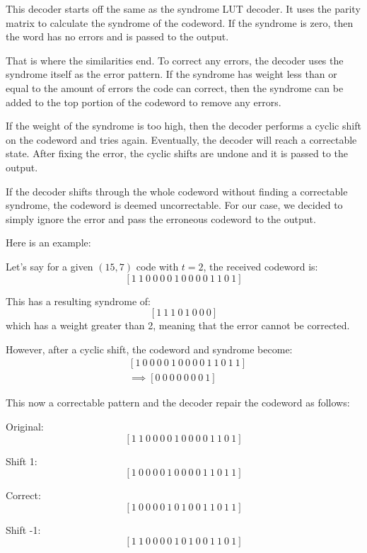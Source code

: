 \documentclass{article}
\begin{document}
This decoder starts off the same as the syndrome LUT decoder. It uses the parity matrix to calculate the syndrome of the codeword. If the syndrome is zero, then the word has no errors and is passed to the output.

That is where the similarities end. To correct any errors, the decoder uses the syndrome itself as the error pattern. If the syndrome has weight less than or equal to the amount of errors the code can correct, then the syndrome can be added to the top portion of the codeword to remove any errors.

If the weight of the syndrome is too high, then the decoder performs a cyclic shift on the codeword and tries again. Eventually, the decoder will reach a correctable state. After fixing the error, the cyclic shifts are undone and it is passed to the output.

If the decoder shifts through the whole codeword without finding a correctable syndrome, the codeword is deemed uncorrectable. For our case, we decided to simply ignore the error and pass the erroneous codeword to the output.


Here is an example:

Let's say for a given $(15,7)$ code with $t=2$, the received codeword is:
\[
    [1\ 1\ 0\ 0\ 0\ 0\ 1\ 0\ 0\ 0\ 0\ 1\ 1\ 0\ 1]
\]

This has a resulting syndrome of:
\[
    [1\ 1\ 1\ 0\ 1\ 0\ 0\ 0]
\]
which has a weight greater than 2, meaning that the error cannot be corrected. 

However, after a cyclic shift, the codeword and syndrome become:
\begin{equation*}
    \begin{split}
        &[1\ 0\ 0\ 0\ 0\ 1\ 0\ 0\ 0\ 0\ 1\ 1\ 0\ 1\ 1] \\
        &\implies [0\ 0\ 0\ 0\ 0\ 0\ 0\ 1]
    \end{split}
\end{equation*}

This now a correctable pattern and the decoder repair the codeword as follows:

Original: 
\[
    [1\ 1\ 0\ 0\ 0\ 0\ 1\ 0\ 0\ 0\ 0\ 1\ 1\ 0\ 1]
\]

Shift 1: 
\[
    [1\ 0\ 0\ 0\ 0\ 1\ 0\ 0\ 0\ 0\ 1\ 1\ 0\ 1\ 1]
\]

Correct:
\[
    [1\ 0\ 0\ 0\ 0\ 1\ 0\ 1\ 0\ 0\ 1\ 1\ 0\ 1\ 1]
\]

Shift -1:
\[
    [1\ 1\ 0\ 0\ 0\ 0\ 1\ 0\ 1\ 0\ 0\ 1\ 1\ 0\ 1]
\]
\end{document}
